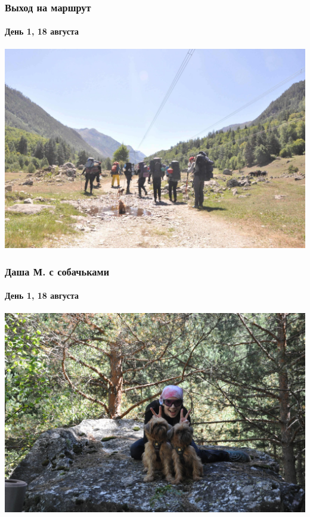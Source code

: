 \begin{frame}
	\frametitle{Выход на маршрут}
	\framesubtitle{День 1, 18 августа}
	\centering
	\includegraphics[width=\linewidth]{../pics/DSC_0412}
\end{frame}

\begin{frame}
	\frametitle{Даша М. с собачьками}
	\framesubtitle{День 1, 18 августа} 
	\includegraphics[width=\textwidth]{../pics/DSC_0475}
%
%
%
%
\end{frame}

